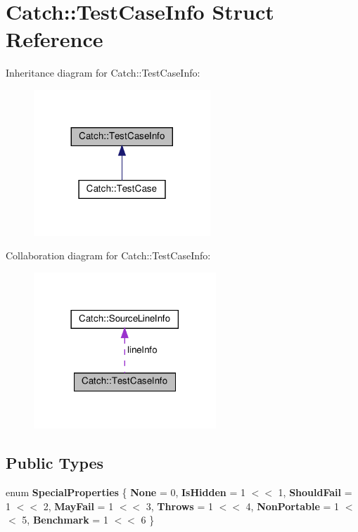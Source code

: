 \hypertarget{structCatch_1_1TestCaseInfo}{}\section{Catch\+::Test\+Case\+Info Struct Reference}
\label{structCatch_1_1TestCaseInfo}


Inheritance diagram for Catch\+::Test\+Case\+Info\+:\nopagebreak
\begin{figure}[H]
\begin{center}
\leavevmode
\includegraphics[width=188pt]{structCatch_1_1TestCaseInfo__inherit__graph}
\end{center}
\end{figure}


Collaboration diagram for Catch\+::Test\+Case\+Info\+:\nopagebreak
\begin{figure}[H]
\begin{center}
\leavevmode
\includegraphics[width=194pt]{structCatch_1_1TestCaseInfo__coll__graph}
\end{center}
\end{figure}
\subsection*{Public Types}
\begin{DoxyCompactItemize}
\item 
\mbox{\label{structCatch_1_1TestCaseInfo_a39b232f74b4a7a6f2183b96759027eac}} 
enum {\bfseries Special\+Properties} \{ \newline
{\bfseries None} = 0, 
{\bfseries Is\+Hidden} = 1 $<$$<$ 1, 
{\bfseries Should\+Fail} = 1 $<$$<$ 2, 
{\bfseries May\+Fail} = 1 $<$$<$ 3, 
\newline
{\bfseries Throws} = 1 $<$$<$ 4, 
{\bfseries Non\+Portable} = 1 $<$$<$ 5, 
{\bfseries Benchmark} = 1 $<$$<$ 6
 \}
\end{DoxyCompactItemize}
